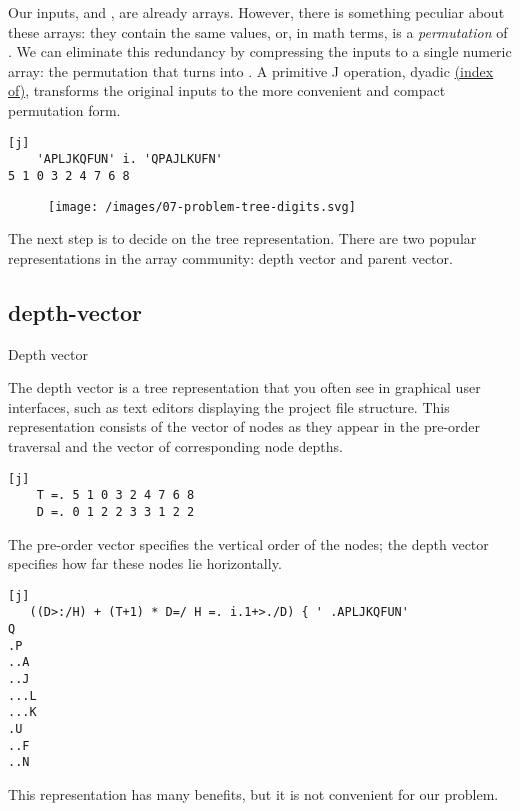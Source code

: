 \documentclass{article}
\begin{document}
Our inputs,  and , are already arrays.
However, there is something peculiar about these arrays: they contain the same values, or, in math terms,  is a \emph{permutation} of .
We can eliminate this redundancy by compressing the inputs to a single numeric array: the permutation that turns  into .
A primitive J operation, dyadic \href{https://code.jsoftware.com/wiki/Vocabulary/idot#dyadic}{ (index of)}, transforms the original inputs to the more convenient and compact permutation form.

\begin{verbatim}[j]
    'APLJKQFUN' i. 'QPAJLKUFN'
5 1 0 3 2 4 7 6 8
\end{verbatim}

\begin{figure}[grayscale-diagram]
\texttt{[image: /images/07-problem-tree-digits.svg]}
\end{figure}

The next step is to decide on the tree representation.
There are two popular representations in the array community: depth vector and parent vector.

\subsection{depth-vector}{Depth vector}

The depth vector is a tree representation that you often see in graphical user interfaces, such as text editors displaying the project file structure.
This representation consists of the vector of nodes as they appear in the pre-order traversal and the vector of corresponding node depths.
\begin{verbatim}[j]
    T =. 5 1 0 3 2 4 7 6 8
    D =. 0 1 2 2 3 3 1 2 2
\end{verbatim}

The pre-order vector specifies the vertical order of the nodes; the depth vector specifies how far these nodes lie horizontally.
\begin{verbatim}[j]
   ((D>:/H) + (T+1) * D=/ H =. i.1+>./D) { ' .APLJKQFUN'
Q
.P
..A
..J
...L
...K
.U
..F
..N
\end{verbatim}

This representation has many benefits, but it is not convenient for our problem.
\end{document}

